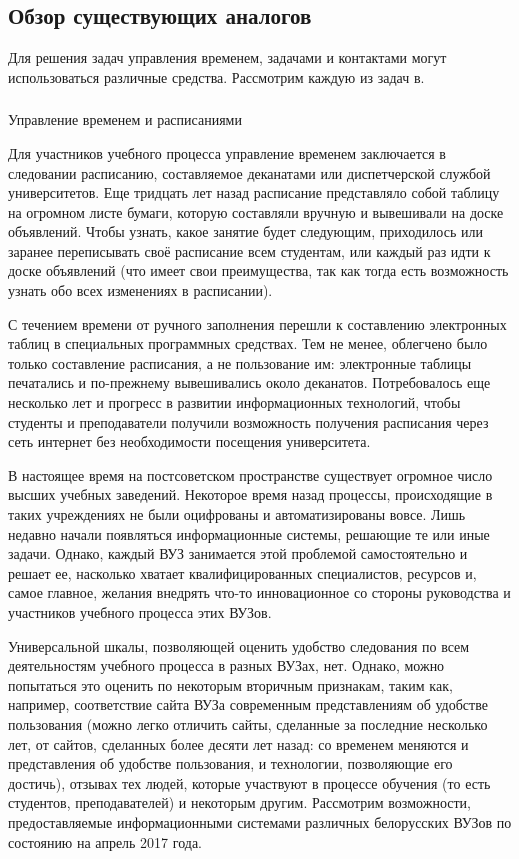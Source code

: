 \subsection{Обзор существующих аналогов}
\label{sec:analysis:analogues}

Для решения задач управления временем, задачами и контактами могут использоваться различные средства. Рассмотрим каждую из задач в.
\newline
\subsubsection{} Управление временем и расписаниями
\label{sec:analysis:analogues:schedules}

Для участников учебного процесса управление временем заключается в следовании расписанию, составляемое деканатами или диспетчерской службой университетов. Еще тридцать лет назад расписание представляло собой таблицу на огромном листе бумаги, которую составляли вручную и вывешивали на доске объявлений. Чтобы узнать, какое занятие будет следующим, приходилось или заранее переписывать своё расписание всем студентам, или каждый раз идти к доске объявлений (что имеет свои преимущества, так как тогда есть возможность узнать обо всех изменениях в расписании).

С течением времени от ручного заполнения перешли к составлению электронных таблиц в специальных программных средствах. Тем не менее, облегчено было только составление расписания, а не пользование им: электронные таблицы печатались и по-прежнему вывешивались около деканатов. Потребовалось еще несколько лет и прогресс в развитии информационных технологий, чтобы студенты и преподаватели получили возможность получения расписания через сеть интернет без необходимости посещения университета.

В настоящее время на постсоветском пространстве существует огромное число высших учебных заведений. Некоторое время назад процессы, происходящие в таких учреждениях не были оцифрованы и автоматизированы вовсе. Лишь недавно начали появляться информационные системы, решающие те или иные задачи. Однако, каждый ВУЗ занимается этой проблемой самостоятельно и решает ее, насколько хватает квалифицированных специалистов, ресурсов и, самое главное, желания внедрять что-то инновационное со стороны руководства и участников учебного процесса этих ВУЗов.

Универсальной шкалы, позволяющей оценить удобство следования по всем деятельностям учебного процесса в разных ВУЗах, нет. Однако, можно попытаться это оценить по некоторым вторичным признакам, таким как, например, соответствие сайта ВУЗа современным представлениям об удобстве пользования (можно легко отличить сайты, сделанные за последние несколько лет, от сайтов, сделанных более десяти лет назад: со временем меняются и представления об удобстве пользования, и технологии, позволяющие его достичь), отзывах тех людей, которые участвуют в процессе обучения (то есть студентов, преподавателей) и некоторым другим. Рассмотрим возможности, предоставляемые информационными системами различных белорусских ВУЗов по состоянию на апрель 2017 года.


